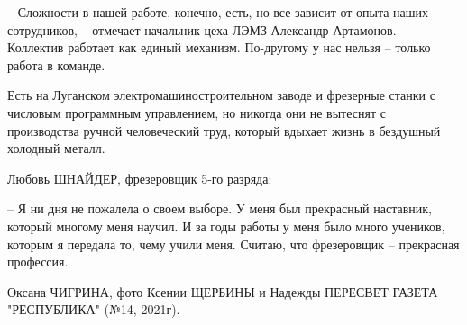 – Сложности в нашей работе, конечно, есть, но все зависит от опыта наших
сотрудников, – отмечает начальник цеха ЛЭМЗ Александр Артамонов. – Коллектив
работает как единый механизм. По-другому у нас нельзя – только работа в
команде.

Есть на Луганском электромашиностроительном заводе и фрезерные станки с
числовым программным управлением, но никогда они не вытеснят с производства
ручной человеческий труд, который вдыхает жизнь в бездушный холодный металл.

Любовь ШНАЙДЕР, фрезеровщик 5-го разряда:

– Я ни дня не пожалела о своем выборе. У меня был прекрасный наставник, который
многому меня научил. И за годы работы у меня было много учеников, которым я
передала то, чему учили меня. Считаю, что фрезеровщик – прекрасная профессия.

Оксана ЧИГРИНА, 
фото Ксении ЩЕРБИНЫ 
и Надежды ПЕРЕСВЕТ
ГАЗЕТА "РЕСПУБЛИКА" (№14, 2021г).
